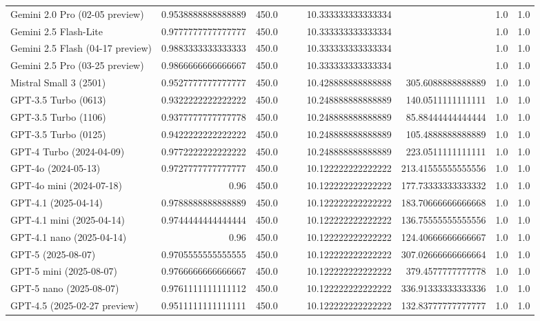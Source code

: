 \begin{table}[htp]
{\begin{tabular}{lrrrrrrrr}
Gemini 2.0 Pro (02-05 preview) & 0.9538888888888889 & 450.0 &  &  & 10.333333333333334 &  & 1.0 & 1.0 \\
Gemini 2.5 Flash-Lite & 0.9777777777777777 & 450.0 &  &  & 10.333333333333334 &  & 1.0 & 1.0 \\
Gemini 2.5 Flash (04-17 preview) & 0.9883333333333333 & 450.0 &  &  & 10.333333333333334 &  & 1.0 & 1.0 \\
Gemini 2.5 Pro (03-25 preview) & 0.9866666666666667 & 450.0 &  &  & 10.333333333333334 &  & 1.0 & 1.0 \\
Mistral Small 3 (2501) & 0.9527777777777777 & 450.0 &  &  & 10.428888888888888 & 305.6088888888889 & 1.0 & 1.0 \\
GPT-3.5 Turbo (0613) & 0.9322222222222222 & 450.0 &  &  & 10.248888888888889 & 140.0511111111111 & 1.0 & 1.0 \\
GPT-3.5 Turbo (1106) & 0.9377777777777778 & 450.0 &  &  & 10.248888888888889 & 85.88444444444444 & 1.0 & 1.0 \\
GPT-3.5 Turbo (0125) & 0.9422222222222222 & 450.0 &  &  & 10.248888888888889 & 105.4888888888889 & 1.0 & 1.0 \\
GPT-4 Turbo (2024-04-09) & 0.9772222222222222 & 450.0 &  &  & 10.248888888888889 & 223.0511111111111 & 1.0 & 1.0 \\
GPT-4o (2024-05-13) & 0.9727777777777777 & 450.0 &  &  & 10.122222222222222 & 213.41555555555556 & 1.0 & 1.0 \\
GPT-4o mini (2024-07-18) & 0.96 & 450.0 &  &  & 10.122222222222222 & 177.73333333333332 & 1.0 & 1.0 \\
GPT-4.1 (2025-04-14) & 0.9788888888888889 & 450.0 &  &  & 10.122222222222222 & 183.70666666666668 & 1.0 & 1.0 \\
GPT-4.1 mini (2025-04-14) & 0.9744444444444444 & 450.0 &  &  & 10.122222222222222 & 136.75555555555556 & 1.0 & 1.0 \\
GPT-4.1 nano (2025-04-14) & 0.96 & 450.0 &  &  & 10.122222222222222 & 124.40666666666667 & 1.0 & 1.0 \\
GPT-5 (2025-08-07) & 0.9705555555555555 & 450.0 &  &  & 10.122222222222222 & 307.02666666666664 & 1.0 & 1.0 \\
GPT-5 mini (2025-08-07) & 0.9766666666666667 & 450.0 &  &  & 10.122222222222222 & 379.4577777777778 & 1.0 & 1.0 \\
GPT-5 nano (2025-08-07) & 0.9761111111111112 & 450.0 &  &  & 10.122222222222222 & 336.91333333333336 & 1.0 & 1.0 \\
GPT-4.5 (2025-02-27 preview) & 0.9511111111111111 & 450.0 &  &  & 10.122222222222222 & 132.83777777777777 & 1.0 & 1.0 \\

\end{tabular}}
\end{table}
